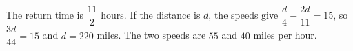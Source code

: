 The return time is $\dfrac{11}{2}$ hours. If the distance is $d$, the speeds give $\dfrac{d}{4}-\dfrac{2d}{11}=15$, so $\dfrac{3d}{44}=15$ and $\boxed{d=220}$ miles. The two speeds are $55$ and $40$ miles per hour.
